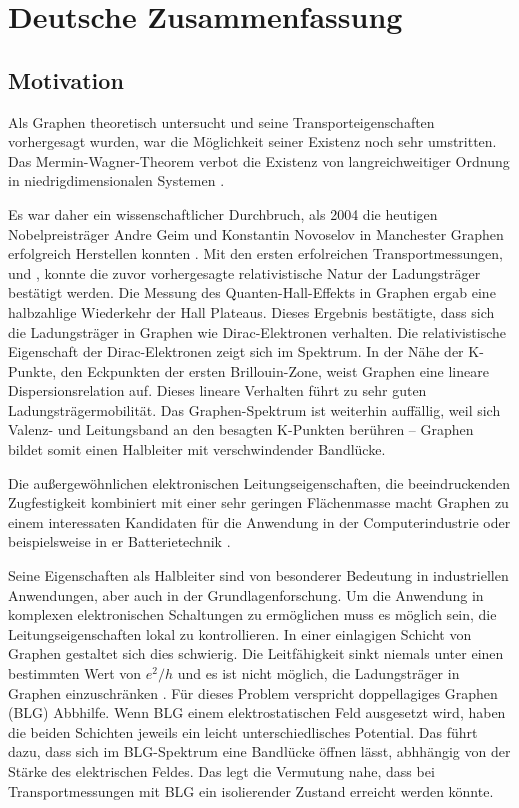 \section*{Deutsche Zusammenfassung}
\subsection*{Motivation}

Als Graphen theoretisch untersucht und seine Transporteigenschaften vorhergesagt wurden, war die M\"oglichkeit seiner Existenz noch sehr umstritten. Das Mermin-Wagner-Theorem verbot die Existenz von langreichweitiger Ordnung in niedrigdimensionalen Systemen \cite{Mermin1966}.

Es war daher ein wissenschaftlicher Durchbruch, als 2004 die heutigen Nobelpreistr\"ager Andre Geim und Konstantin Novoselov in Manchester Graphen erfolgreich Herstellen konnten \cite{Novoselov2004}. Mit den ersten erfolreichen Transportmessungen, \cite{Zhang2005} und \cite{Novoselov2005}, konnte die zuvor vorhergesagte relativistische Natur der Ladungstr\"ager \cite{Semenoff1984} best\"atigt werden. Die Messung des Quanten-Hall-Effekts in Graphen ergab eine halbzahlige Wiederkehr der Hall Plateaus. Dieses Ergebnis best\"atigte, dass sich die Ladungstr\"ager in Graphen wie Dirac-Elektronen verhalten.
Die relativistische Eigenschaft der Dirac-Elektronen zeigt sich im Spektrum. In der N\"ahe der K-Punkte, den Eckpunkten der ersten Brillouin-Zone, weist Graphen eine lineare Dispersionsrelation auf. Dieses lineare Verhalten f\"uhrt zu sehr guten Ladungstr\"agermobilit\"at. Das Graphen-Spektrum ist weiterhin auff\"allig, weil sich Valenz- und Leitungsband an den besagten K-Punkten ber\"uhren -- Graphen bildet somit einen Halbleiter mit verschwindender Bandl\"ucke. 

Die au{\ss}ergew\"ohnlichen elektronischen Leitungseigenschaften, die beeindruckenden Zugfestigkeit kombiniert mit einer sehr geringen Fl\"achenmasse macht Graphen zu einem interessaten Kandidaten f\"ur die Anwendung in der Computerindustrie \cite{Jurewicz2014} oder beispielsweise in er Batterietechnik \cite{Son2017}.

Seine Eigenschaften als Halbleiter sind von besonderer Bedeutung in industriellen Anwendungen, aber auch in der Grundlagenforschung. Um die Anwendung in komplexen elektronischen Schaltungen zu erm\"oglichen muss es m\"oglich sein, die Leitungseigenschaften lokal zu kontrollieren. In einer einlagigen Schicht von Graphen gestaltet sich dies schwierig. Die Leitf\"ahigkeit sinkt niemals unter einen bestimmten Wert von $e^2/h$ und es ist nicht m\"oglich, die Ladungstr\"ager in Graphen einzuschr\"anken \cite{Katsnelson2006}. F\"ur dieses Problem verspricht doppellagiges Graphen (BLG) Abbhilfe. Wenn BLG einem elektrostatischen Feld ausgesetzt wird, haben die beiden Schichten jeweils ein leicht unterschiedlisches Potential. Das f\"uhrt dazu, dass sich im BLG-Spektrum eine Bandl\"ucke \"offnen l\"asst, abhh\"angig von der St\"arke des elektrischen Feldes. Das legt die Vermutung nahe, dass bei Transportmessungen mit BLG ein isolierender Zustand erreicht werden k\"onnte.

